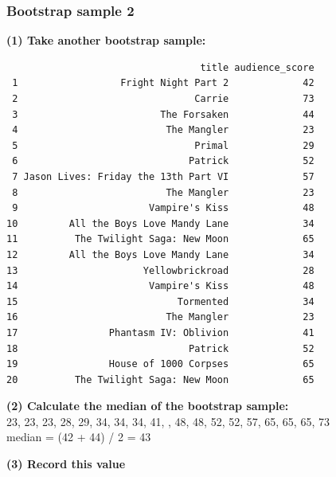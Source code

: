 \documentclass[slidestop,compress,mathserif,12pt,t,professionalfonts,xcolor=table]{beamer}
\begin{document}
\begin{frame}[fragile]
\frametitle{Bootstrap sample 2}

{\small \textbf{(1) Take another bootstrap sample:}}
\pause
{\tiny
\begin{verbatim}
                                  title audience_score
 1                  Fright Night Part 2             42
 2                               Carrie             73
 3                         The Forsaken             44
 4                          The Mangler             23
 5                               Primal             29
 6                              Patrick             52
 7 Jason Lives: Friday the 13th Part VI             57
 8                          The Mangler             23
 9                       Vampire's Kiss             48
10         All the Boys Love Mandy Lane             34
11          The Twilight Saga: New Moon             65
12         All the Boys Love Mandy Lane             34
13                      Yellowbrickroad             28
14                       Vampire's Kiss             48
15                            Tormented             34
16                          The Mangler             23
17                Phantasm IV: Oblivion             41
18                              Patrick             52
19                House of 1000 Corpses             65
20          The Twilight Saga: New Moon             65
\end{verbatim}
}

\pause

{\small \textbf{(2) Calculate the median of the bootstrap sample:}} \\
\pause
{\footnotesize
23, 23, 23, 28, 29, 34, 34, 34, 41, , 48, 48, 52, 52, 57, 65, 65, 65, 73 \\
median = (42 + 44) / 2 = 43 \\
}

\pause

{\small
\textbf{(3) Record this value}
}

\end{frame}

\end{document}
